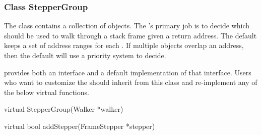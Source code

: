 \subsubsection{Class StepperGroup}
\label{subsec:steppergroup}

The  class contains a collection of  objects. The
's primary job is to decide which  should be used to
walk through a stack frame given a return address. The default 
keeps a set of address ranges for each . If multiple 
objects overlap an address, then the default  will use a priority
system to decide.

 provides both an interface and a default implementation of that
interface. Users who want to customize the  should inherit from this
class and re-implement any of the below virtual functions.

\begin{apient}
virtual StepperGroup(Walker *walker)
\end{apient}

\begin{apient}
virtual bool addStepper(FrameStepper *stepper)
\end{apient}

